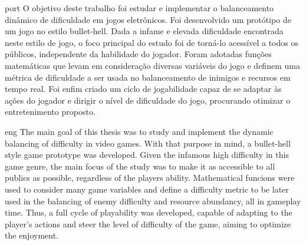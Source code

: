 
\begin{resumo}{port}
O objetivo deste trabalho foi estudar e implementar o balanceamento dinâmico
de dificuldade em jogos eletrônicos. Foi desenvolvido um protótipo de um jogo
no estilo bullet-hell. Dada a infame e elevada dificuldade encontrada
neste estilo de jogo, o foco principal do estudo foi de torná-lo
acessível a todos os públicos, independente da habilidade do jogador. Foram
adotadas funções matemáticas que levam em consideração diversas variáveis
do jogo e definem uma métrica de dificuldade a ser usada no balanceamento de
inimigos e recursos em tempo real. Foi enfim criado um ciclo de jogabilidade
capaz de se adaptar às ações do jogador e dirigir o nível de dificuldade
do jogo, procurando otimizar o entretenimento proposto.
\end{resumo}


\begin{resumo}{eng}
The main goal of this thesis was to study and implement the dynamic balancing
of difficulty in video games. With that purpose in mind, a bullet-hell style
game prototype was developed. Given the infamous high difficulty in this
game genre, the main focus of the study was to make it as accessible to all
publics as possible, regardless of the players ability. Mathematical funcions
were used to consider many game variables and define a difficulty metric to
be later used in the balancing of enemy difficulty and resource abundancy,
all in gameplay time. Thus, a full cycle of playability was developed,
capable of adapting to the player's actions and steer the level of difficulty
of the game, aiming to optimize the enjoyment.
\end{resumo}



